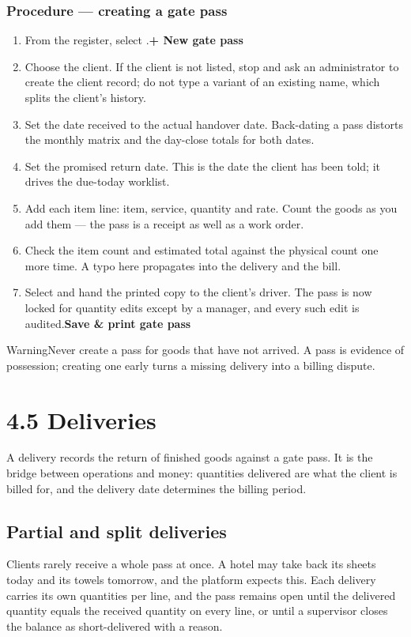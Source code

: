 \documentclass[11pt,a4paper,oneside]{book}
\begin{document}
\subsubsection*{Procedure — creating a gate pass}
\begin{enumerate}
\item From the register, select .\textbf{+ New gate pass}
\item Choose the client. If the client is not listed, stop and ask an administrator to create the client record; do not type a variant of an existing name, which splits the client's history.
\item Set the date received to the actual handover date. Back-dating a pass distorts the monthly matrix and the day-close totals for both dates.
\item Set the promised return date. This is the date the client has been told; it drives the due-today worklist.
\item Add each item line: item, service, quantity and rate. Count the goods as you add them — the pass is a receipt as well as a work order.
\item Check the item count and estimated total against the physical count one more time. A typo here propagates into the delivery and the bill.
\item Select  and hand the printed copy to the client's driver. The pass is now locked for quantity edits except by a manager, and every such edit is audited.\textbf{Save \& print gate pass}
\end{enumerate}
\begin{notebox}WarningNever create a pass for goods that have not arrived. A pass is evidence of possession; creating one early turns a missing delivery into a billing dispute.\end{notebox}
\section{4.5 Deliveries}
A delivery records the return of finished goods against a gate pass. It is the bridge between operations and money: quantities delivered are what the client is billed for, and the delivery date determines the billing period.

\subsection*{Partial and split deliveries}
Clients rarely receive a whole pass at once. A hotel may take back its sheets today and its towels tomorrow, and the platform expects this. Each delivery carries its own quantities per line, and the pass remains open until the delivered quantity equals the received quantity on every line, or until a supervisor closes the balance as short-delivered with a reason.
\end{document}
